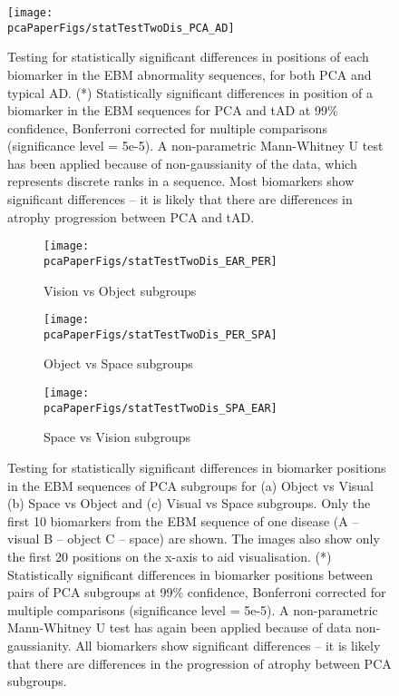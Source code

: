 \begin{figure}
 \texttt{[image: \\pcaPaperFigs/statTestTwoDis\_PCA\_AD]}
 \caption[Testing for statistically significant differences in positions of each biomarker in the EBM abnormality sequences, for both PCA and typical AD.]{Testing for statistically significant differences in positions of each biomarker in the EBM abnormality sequences, for both PCA and typical AD. (*) Statistically significant differences in position of a biomarker in the EBM sequences for PCA and tAD at 99\% confidence, Bonferroni corrected for multiple comparisons (significance level = 5e-5). A non-parametric Mann-Whitney U test has been applied because of non-gaussianity of the data, which represents discrete ranks in a sequence. Most biomarkers show significant differences -- it is likely that there are differences in atrophy progression between PCA and tAD.}
 \label{fig:ebmStatTestPcaAd}
\end{figure}


\begin{figure}
\begin{subfigure}{\textwidth}
\texttt{[image: \\pcaPaperFigs/statTestTwoDis\_EAR\_PER]}
\caption{Vision vs Object subgroups}
\end{subfigure}

\begin{subfigure}{\textwidth}
\texttt{[image: \\pcaPaperFigs/statTestTwoDis\_PER\_SPA]}
\caption{Object vs Space subgroups}
\end{subfigure}


\begin{subfigure}{\textwidth}
\texttt{[image: \\pcaPaperFigs/statTestTwoDis\_SPA\_EAR]}
\caption{Space vs Vision subgroups}
\end{subfigure}

\caption[Testing for statistically significant differences in biomarker positions in the EBM sequences of PCA subgroups.]{Testing for statistically significant differences in biomarker positions in the EBM sequences of PCA subgroups for (a) Object vs Visual (b) Space vs Object and (c) Visual vs Space subgroups.  Only the first 10 biomarkers from the EBM sequence of one disease (A -- visual B -- object C -- space) are shown. The images also show only the first 20 positions on the x-axis to aid visualisation. (*) Statistically significant differences in biomarker positions between pairs of PCA subgroups at 99\% confidence, Bonferroni corrected for multiple comparisons (significance level = 5e-5). A non-parametric Mann-Whitney U test has again been applied because of data non-gaussianity. All biomarkers show significant differences -- it is likely that there are differences in the progression of atrophy between PCA subgroups.}
\label{fig:ebmStatTestPcaSubgroups}
\end{figure}


